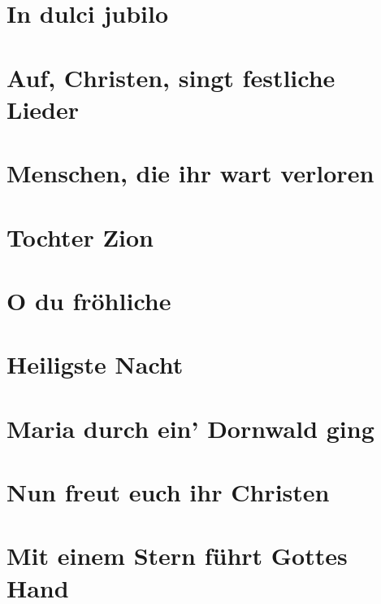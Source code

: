 \documentclass[10pt]{article}
\begin{document}
\section{In dulci jubilo}


\section{Auf, Christen, singt festliche Lieder}

\section{Menschen, die ihr wart verloren}

\section{Tochter Zion}

\section{O du fröhliche}

\section{Heiligste Nacht}

\section{Maria durch ein' Dornwald ging}

\section{Nun freut euch ihr Christen}


\section{Mit einem Stern führt Gottes Hand}
\end{document}
